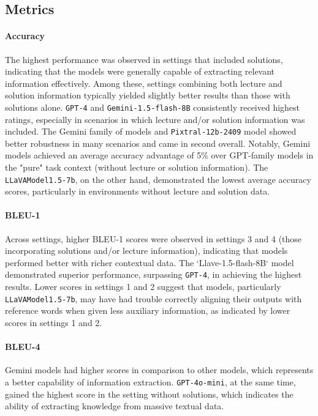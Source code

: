 \documentclass{article}
\begin{document}
\subsection{Metrics}
\paragraph{Accuracy}
The highest performance was observed in settings that included solutions, indicating that the models were generally capable of extracting relevant information effectively. Among these, settings combining both lecture and solution information typically yielded slightly better results than those with solutions alone. \texttt{GPT-4} and \texttt{Gemini-1.5-flash-8B} consistently received highest ratings, especially in scenarios in which lecture and/or solution information was included. The Gemini family of models and  \texttt{Pixtral-12b-2409} model showed better robustness in many scenarios and came in second overall. Notably, Gemini models achieved an average accuracy advantage of 5\% over GPT-family models in the "pure" task context (without lecture or solution information). The \texttt{LLaVAModel1.5-7b}, on the other hand, demonstrated the lowest average accuracy scores, particularly in environments without lecture and solution data.

\paragraph{BLEU-1}
Across settings, higher BLEU-1 scores were observed in settings 3 and 4 (those incorporating solutions and/or lecture information), indicating that models performed better with richer contextual data. The `Llave-1.5-flash-8B` model demonstrated superior performance, surpassing \texttt{GPT-4}, in achieving the highest results. Lower scores in settings 1 and 2 suggest that models, particularly \texttt{LLaVAModel1.5-7b}, may have had trouble correctly aligning their outputs with reference words when given less auxiliary information, as indicated by lower scores in settings 1 and 2. 

\paragraph{BLEU-4}
Gemini models had higher scores in comparison to other models, which represents a better capability of information extraction. \texttt{GPT-4o-mini}, at the same time, gained the highest score in the setting without solutions, which indicates the ability of extracting knowledge from massive textual data.
\end{document}
